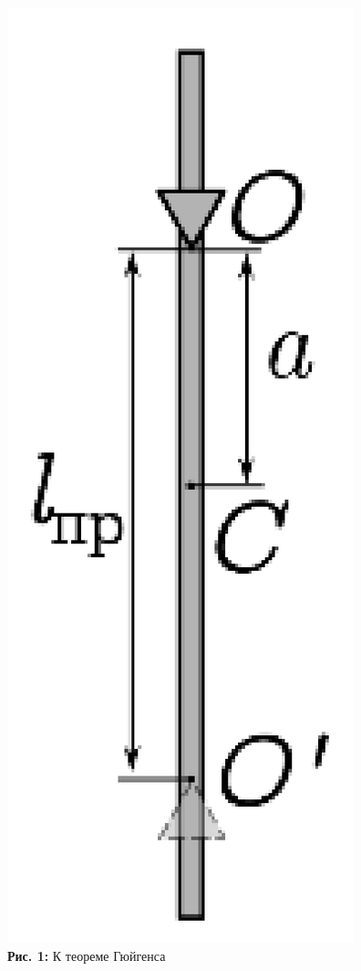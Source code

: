 \documentclass[12pt,a4paper]{scrartcl}
\begin{document}
\begin{figure}[h]
\begin{minipage}{0.3\linewidth}
\begin{center}
				\includegraphics[scale=0.1]{PIC_1.png}
				\\\textbf{Рис. 1:} К теореме Гюйгенса
			\end{center}
		\end{minipage}
	\end{figure}
\end{document}

